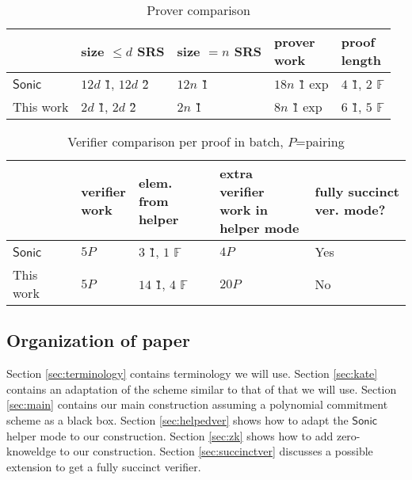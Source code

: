 \documentclass[11pt]{article}
\numberwithin{figure}{section} %
\newcommand{\F}{\ensuremath{\mathbb F}\xspace}
\newcommand{\sonic}{\ensuremath{\mathsf{Sonic}}\xspace}
\begin{document}
\begin{table}[ht]
\caption{Prover comparison}
\centering
\begin{tabular}{l|l|l|l|l}
                     & \thead{size $\leq d$\\ SRS} & \thead{size $=n$\\ SRS} & \thead{prover\\ work} & \thead{proof\\ length}  \\ \hline
\sonic           &  $12d$ \G1, $12d$ \G2 &   $12n$ \G1    &   $18n$ \G1 exp &  $4$ \G1, $2$ $\F$             \\        \hline
This work &  $2d$ \G1, $2d$ \G2  &      $2n$ \G1  &   $8n$ \G1 exp  &   $6$ \G1, $5$ \F     \\     \hline
\end{tabular}
\end{table}


 \begin{table}[ht]
 \caption{Verifier comparison per proof in batch, $P$=pairing}
\centering
 \begin{tabular}{l|l|l|l|l}
                      &  \thead{verifier\\ work} & \thead{elem. from\\ helper} & \thead{extra verifier \\ work in\\ helper mode} &\thead{fully succinct\\ ver. mode?}\\ \hline
 \sonic           &   $5P$  &  $3$ \G1, $1$ \F  & $4P$ & Yes         \\        \hline
 This work &  $5P$  &  $14$ \G1, $4$ \F & $20P$  & No \\     \hline
 \end{tabular}
 \end{table}
 

 \subsection{Organization of paper}
 Section \ref{sec:terminology} contains terminology we will use. Section \ref{sec:kate} contains an adaptation of the \cite{kate} scheme similar to that of \cite{sonic} that we will use. Section \ref{sec:main} contains our main construction assuming a polynomial commitment scheme as a black box.
 Section \ref{sec:helpedver} shows how to adapt the \sonic helper mode to our construction. Section \ref{sec:zk} shows how to add zero-knoweldge to our construction. Section \ref{sec:succinctver} discusses a possible extension to get a fully succinct verifier.
 
\end{document}
